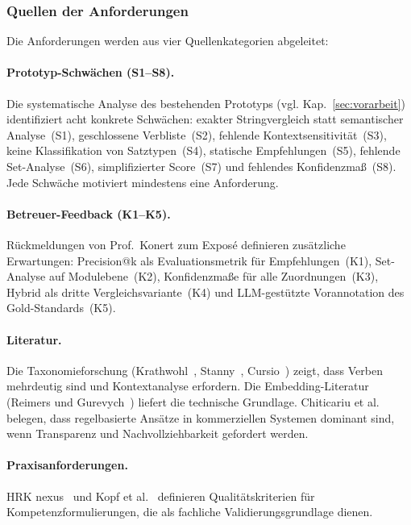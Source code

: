 \subsubsection{Quellen der Anforderungen}\label{sec:anf-quellen}

Die Anforderungen werden aus vier Quellenkategorien abgeleitet:

\paragraph{Prototyp-Schwächen (S1--S8).}
Die systematische Analyse des bestehenden Prototyps (vgl. Kap.~\ref{sec:vorarbeit}) identifiziert acht konkrete Schwächen: exakter Stringvergleich statt semantischer Analyse~(S1), geschlossene Verbliste~(S2), fehlende Kontextsensitivität~(S3), keine Klassifikation von Satztypen~(S4), statische Empfehlungen~(S5), fehlende Set-Analyse~(S6), simplifizierter Score~(S7) und fehlendes Konfidenzmaß~(S8).
Jede Schwäche motiviert mindestens eine Anforderung.

\paragraph{Betreuer-Feedback (K1--K5).}
Rückmeldungen von Prof.\ Konert zum Exposé definieren zusätzliche Erwartungen: Precision@k als Evaluationsmetrik für Empfehlungen~(K1), Set-Analyse auf Modulebene~(K2), Konfidenzmaße für alle Zuordnungen~(K3), Hybrid als dritte Vergleichsvariante~(K4) und LLM-gestützte Vorannotation des Gold-Standards~(K5).

\paragraph{Literatur.}
Die Taxonomieforschung (Krathwohl~\cite{krathwohl2002revision}, Stanny~\cite{stanny2016reevaluating}, Cursio~\cite{cursio2013leitfaden}) zeigt, dass Verben mehrdeutig sind und Kontextanalyse erfordern.
Die Embedding-Literatur (Reimers und Gurevych~\cite{reimers2019sentencebert}) liefert die technische Grundlage.
Chiticariu et al.~\cite{chiticariu2013rulebased} belegen, dass regelbasierte Ansätze in kommerziellen Systemen dominant sind, wenn Transparenz und Nachvollziehbarkeit gefordert werden.

\paragraph{Praxisanforderungen.}
HRK nexus~\cite{hrknexus2015lernergebnisse} und Kopf et al.~\cite{kopf2010kompetenzen} definieren Qualitätskriterien für Kompetenzformulierungen, die als fachliche Validierungsgrundlage dienen.

